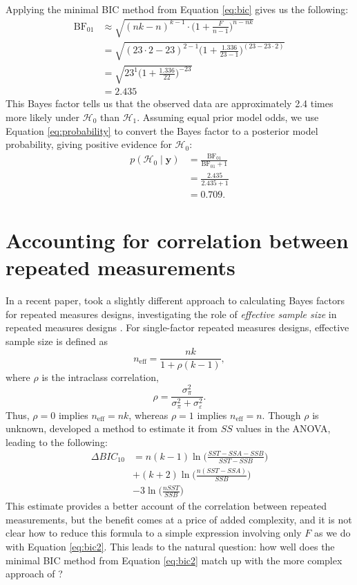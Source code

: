 \documentclass[12pt,twoside,a4paper]{article}
\begin{document}
Applying the minimal BIC method from Equation \ref{eq:bic} gives us the following:%
\begin{align*}
  \text{BF}_{01} &\approx \sqrt{(nk-n)^{k-1}\cdot \Biggl(1+\frac{F}{n-1}\Biggr)^{n-nk}}\\
         &= \sqrt{(23\cdot 2-23)^{2-1}\Biggl(1+\frac{1.336}{23-1}\Biggr)^{(23-23\cdot 2)}}\\
         &= \sqrt{23^1\Biggr(1+\frac{1.336}{22}\Biggr)^{-23}}\\
  &=2.435
\end{align*}%
This Bayes factor tells us that the observed data are approximately 2.4 times more likely under $\mathcal{H}_0$ than $\mathcal{H}_1$. Assuming equal prior model odds, we use Equation \ref{eq:probability} to convert the Bayes factor to a posterior model probability, giving positive evidence for $\mathcal{H}_0$:%
\begin{align*}
  p(\mathcal{H}_0\mid \bm{y}) &= \frac{\text{BF}_{01}}{\text{BF}_{01}+1}\\
                                   &= \frac{2.435}{2.435+1}\\
  &= 0.709.
\end{align*}

\section{Accounting for correlation between repeated measurements}

In a recent paper, \citet{nathoo2016} took a slightly different approach to calculating Bayes factors for repeated measures designs, investigating the role of {\it effective sample size} in repeated measures designs \citep{jones2011}. For single-factor repeated measures designs, effective sample size is defined as%
\[
  n_{\text{eff}}=\frac{nk}{1+\rho(k-1)},
\]%
where $\rho$ is the intraclass correlation,%
\[
  \rho=\frac{\sigma_{\pi}^2}{\sigma_{\pi}^2+\sigma_{\varepsilon}^2}.
\]%
Thus, $\rho=0$ implies $n_{\text{eff}}=nk$, whereas $\rho=1$ implies $n_{\text{eff}}=n$. Though $\rho$ is unknown, \citet{nathoo2016} developed a method to estimate it from $SS$ values in the ANOVA, leading to the following:%
\begin{align*}
  \Delta BIC_{10} &= n(k-1)\ln\Biggl(\frac{SST-SSA-SSB}{SST-SSB}\Biggr)\\ 
                  &+(k+2)\ln\Biggl(\frac{n(SST-SSA)}{SSB}\Biggr)\\
  &-3\ln\Biggl(\frac{nSST}{SSB}\Biggr) 
\end{align*}%
This estimate provides a better account of the correlation between repeated measurements, but the benefit comes at a price of added complexity, and it is not clear how to reduce this formula to a simple expression involving only $F$ as we do with Equation \ref{eq:bic2}. This leads to the natural question: how well does the minimal BIC method from Equation \ref{eq:bic2} match up with the more complex approach of \citet{nathoo2016}?
\end{document}
